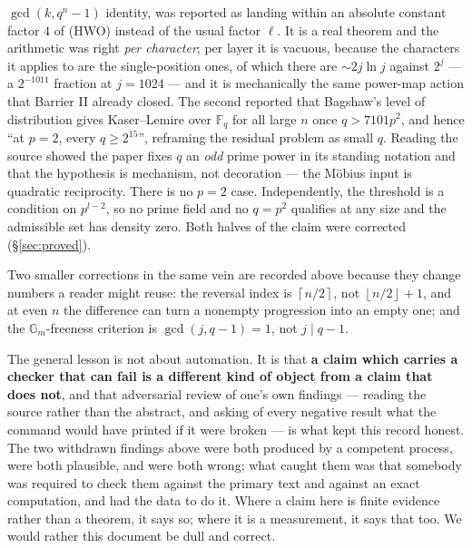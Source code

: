 \documentclass[10pt]{article}
\theoremstyle{plain}
\theoremstyle{definition}
\newcommand{\F}{\mathbb F}
\newcommand{\ceil}[1]{\left\lceil #1\right\rceil}
\newcommand{\flr}[1]{\left\lfloor #1\right\rfloor}
\begin{document}
\begin{enumerate}[label=\arabic*.]
$\gcd(k,q^n-1)$ identity, was reported as landing within an absolute constant
factor 4 of (HWO) instead of the usual factor $\ell$. It is a real theorem and
the arithmetic was right \emph{per character}; per layer it is vacuous, because
the characters it applies to are the single-position ones, of which there are
$\sim2j\ln j$ against $2^j$ --- a $2^{-1011}$ fraction at $j=1024$ --- and it is
mechanically the same power-map action that Barrier II already closed. The
second reported that Bagshaw's level of distribution gives Kaser--Lemire over
$\F_q$ for all large $n$ once $q>7101p^2$, and hence ``at $p=2$, every
$q\ge2^{15}$'', reframing the residual problem as small $q$. Reading the source
showed the paper fixes $q$ an \emph{odd} prime power in its standing notation
and that the hypothesis is mechanism, not decoration --- the M\"obius input is
quadratic reciprocity. There is no $p=2$ case. Independently, the threshold is
a condition on $p^{l-2}$, so no prime field and no $q=p^2$ qualifies at any
size and the admissible set has density zero. Both halves of the claim were
corrected (\S\ref{sec:proved}).
\end{enumerate}

Two smaller corrections in the same vein are recorded above because they change
numbers a reader might reuse: the reversal index is $\ceil{n/2}$, not
$\flr{n/2}+1$, and at even $n$ the difference can turn a nonempty progression
into an empty one; and the $\mathbb G_m$-freeness criterion is
$\gcd(j,q-1)=1$, not $j\mid q-1$.

The general lesson is not about automation. It is that \textbf{a claim which
carries a checker that can fail is a different kind of object from a claim that
does not}, and that adversarial review of one's own findings --- reading the
source rather than the abstract, and asking of every negative result what the
command would have printed if it were broken --- is what kept this record
honest. The two withdrawn findings above were both produced by a competent
process, were both plausible, and were both wrong; what caught them was that
somebody was required to check them against the primary text and against an
exact computation, and had the data to do it. Where a claim here is finite
evidence rather than a theorem, it says so; where it is a measurement, it says
that too. We would rather this document be dull and correct.
\end{document}
